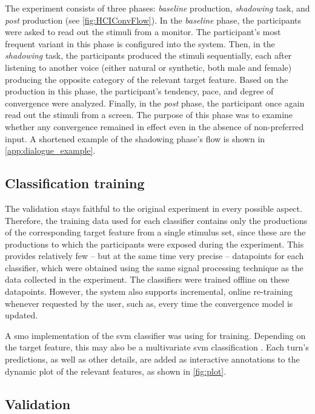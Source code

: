 The experiment consists of three phases: \emph{baseline} production, \emph{shadowing} task, and \emph{post} production (see \cref{fig:HCIConvFlow}).
In the \emph{baseline} phase, the participants were asked to read out the stimuli from a monitor.
The participant's most frequent variant in this phase is configured into the system.
Then, in the \emph{shadowing} task, the participants produced the stimuli sequentially, each after listening to another voice (either natural or synthetic, both male and female) producing the opposite category of the relevant target feature.
Based on the production in this phase, the participant's tendency, pace, and degree of convergence were analyzed.
Finally, in the \emph{post} phase, the participant once again read out the stimuli from a screen.
The purpose of this phase was to examine whether any convergence remained in effect even in the absence of non-preferred input.
A shortened example of the shadowing phase's flow is shown in \cref{app:dialogue_example}.

\subsection{Classification training}
\label{subsec:classification_training}

The validation stays faithful to the original experiment in every possible aspect.
Therefore, the training data used for each classifier contains only the productions of the corresponding target feature from a single stimulus set, since these are the productions to which the participants were exposed during the experiment.
This provides relatively few -- but at the same time very precise -- datapoints for each classifier,
which were obtained using the same signal processing technique as the data collected in the experiment.
The classifiers were trained offline on these datapoints.
However, the system also supports incremental, online re-training whenever requested by the user,
such as, every time the convergence model is updated.

A \ac{smo} \citep{Platt1999fast, Platt1998sequential} implementation of the \ac{svm} classifier \citep{Vapnik1998support} was using for training.
Depending on the target feature, this may also be a multivariate \ac{svm} classification \citep[e.g.,][]{Joachims2005support}.
Each turn's predictions, as well as other details, are added as interactive annotations to the dynamic plot of the relevant features, as shown in \cref{fig:plot}.

\subsection{Validation}
\label{subsec:validation}

